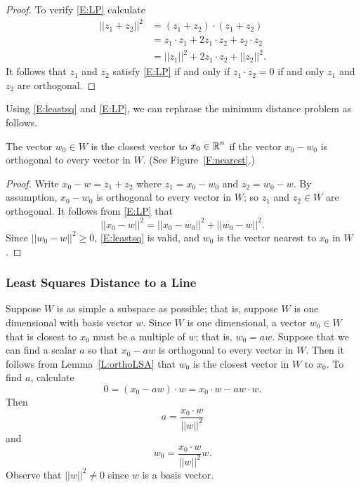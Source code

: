 \documentclass{ximera}
\begin{document}
\begin{proof}
To verify \eqref{E:LP} calculate 
\begin{align*}
  ||z_1+z_2||^2&=(z_1+z_2)\cdot(z_1+z_2) \\
  &=z_1\cdot z_1 +2z_1\cdot z_2+z_2\cdot z_2 \\
  &=||z_1||^2 + 2z_1\cdot z_2 +||z_2||^2.
\end{align*}
It follows that $z_1$ and $z_2$ satisfy \eqref{E:LP} if and only if $z_1\cdot z_2 = 0$  
if and only $z_1$ and $z_2$ are orthogonal.
\end{proof}

Using \eqref{E:leastsq} and \eqref{E:LP}, we can rephrase the minimum distance 
problem as follows.
\begin{lemma}  \label{L:orthoLSA}
The vector $w_0\in W$ is the closest vector to $x_0\in\mbox{$\mathbb{R}$}^n$ if the vector 
$x_0-w_0$ is orthogonal to every vector in $W$. (See Figure~\ref{F:nearest}.)
\end{lemma}

\begin{proof}  Write $x_0-w=z_1+z_2$ where $z_1=x_0-w_0$ and $z_2=w_0-w$.  By 
assumption, $x_0-w_0$ is orthogonal to every vector in $W$; so $z_1$ and 
$z_2\in W$ are orthogonal.  It follows from \eqref{E:LP} that
\[
||x_0-w||^2 = ||x_0-w_0||^2 + ||w_0-w||^2.
\]
Since $||w_0-w||^2\ge 0$, \eqref{E:leastsq} is valid, and $w_0$ is the vector 
nearest to $x_0$ in $W$. \end{proof}

\subsubsection*{Least Squares Distance to a Line}

Suppose $W$ is as simple a subspace as possible; that is, suppose $W$ is one
dimensional with basis vector $w$.  Since $W$ is one dimensional, a vector
$w_0\in W$ that is closest to $x_0$ must be a multiple of $w$; that is,
$w_0=aw$.  Suppose that we can find a scalar $a$ so that $x_0-aw$ is
orthogonal to every vector in $W$.  Then it follows from
Lemma~\ref{L:orthoLSA} that $w_0$ is the closest vector in $W$ to $x_0$.
To find $a$, calculate
\[
0 = (x_0-aw)\cdot w = x_0\cdot w - a w\cdot w.
\]
Then
\[
a = \frac{x_0\cdot w}{||w||^2}
\]
and
\begin{equation}  \label{E:singleortho}
w_0 = \frac{x_0\cdot w}{||w||^2} w.
\end{equation}
Observe that $||w||^2\not=0$ since $w$ is a basis vector.
\end{document}
